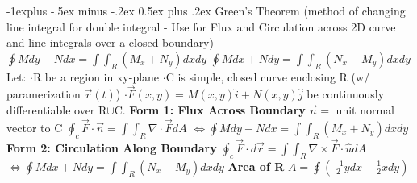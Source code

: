 \documentclass[10pt,landscape]{article}
\makeatletter
\renewcommand{\subsection}{\@startsection{subsection}{2}{0mm}%
                                {-1explus -.5ex minus -.2ex}%
                                {0.5ex plus .2ex}%
                                {\normalfont\normalsize\bfseries}}
\makeatother
\begin{document}
\begin{multicols*}{5}
\subsection{Green's Theorem}
(method of changing line integral for double integral - Use for Flux and Circulation across 2D curve and line integrals over a closed boundary)\newline
$ \oint Mdy - Ndx = \int\int_R(M_x+N_y)dxdy $\newline
$ \oint Mdx + Ndy = \int\int_R (N_x-M_y) dxdy $\newline
Let:\newline
$\cdot$R be a region in xy-plane\newline
$\cdot$C is simple, closed curve enclosing R (w/ paramerization $ \vec{r}(t) $)\newline
$ \cdot\vec{F}(x,y) = M(x,y)\hat{i} + N(x,y)\hat{j} $ be continuously differentiable over R$\cup$C. \newline
\textbf{Form 1: Flux Across Boundary}\newline
$ \vec{n} = $ unit normal vector to C\newline
$ \oint_c \vec{F}\cdot\vec{n} = \int\int_R \nabla\cdot\vec{F} dA $\newline
$ \Leftrightarrow\oint Mdy - Ndx = \int\int_R(M_x+N_y)dxdy $\newline
\textbf{Form 2: Circulation Along Boundary}\newline
$ \oint_c\vec{F}\cdot d\vec{r} = \int\int_R \nabla\times\vec{F}\cdot\hat{u} dA $\newline
$ \Leftrightarrow \oint Mdx + Ndy = \int\int_R (N_x-M_y) dxdy $\newline
\textbf{Area of R}\newline
$ A = \oint(\frac{-1}{2}y dx + \frac{1}{2}x dy) $

\begin{comment}
 \subsection{Gauss' Divergence Thm}
(3D Analog of Green's Theorem - Use for Flux over a 3D surface)
Let:\newline
$ \cdot\vec{F}(x,y,z) $ be vector field continuously differentiable in solid S\newline
$ \cdot $S is a 3D solid
$ \cdot\partial S $ boundary of S (A Surface)\newline
$ \cdot\hat{n} $unit outer normal to $ \partial S $\newline
Then,\newline
$ \int\int_{\partial S}\vec{F}(x,y,z)\cdot\hat{n}dS = \int\int\int_S\nabla\cdot\vec{F} dV $\newline
(dV = dxdydz)
\end{comment}


\end{multicols*}
\end{document}

